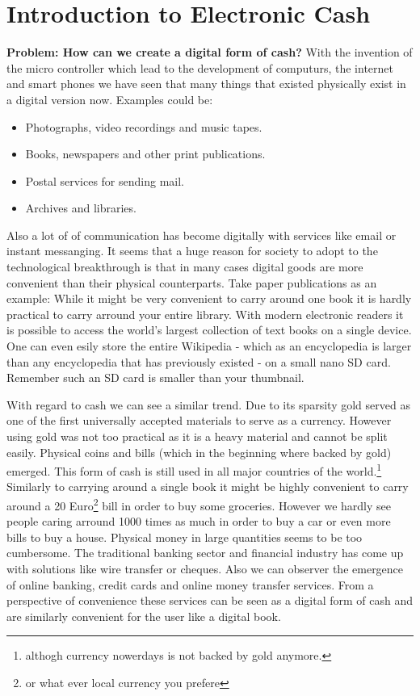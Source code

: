 \documentclass[ebook,12pt,oneside,openany]{memoir}
\newcommand{\problem}[1]{\textbf{Problem: #1}}
\begin{document}
\section{Introduction to Electronic Cash}
\problem{How can we create a digital form of cash?}
With the invention of the micro controller which lead to the development of computurs, the internet and smart phones we have seen that many things that existed physically exist in a digital version now.
Examples could be:
\begin{itemize}
\item Photographs, video recordings and music tapes.
\item Books, newspapers and other print publications.
\item Postal services for sending mail.
\item Archives and libraries.
\end{itemize}
Also a lot of of communication has become digitally with services like email or instant messanging.
It seems that a huge reason for society to adopt to the technological breakthrough is that in many cases digital goods are more convenient than their physical counterparts.
Take paper publications as an example: While it might be very convenient to carry around one book it is hardly practical to carry arround your entire library.
With modern electronic readers it is possible to access the world's largest collection of text books on a single device.
One can even esily store the entire Wikipedia - which as an encyclopedia is larger than any encyclopedia that has previously existed - on a small nano SD card.
Remember such an SD card is smaller than your thumbnail.

With regard to cash we can see a similar trend.
Due to its sparsity gold served as one of the first universally accepted materials to serve as a currency.
However using gold was not too practical as it is a heavy material and cannot be split easily.
Physical coins and bills (which in the beginning where backed by gold) emerged.
This form of cash is still used in all major countries of the world.\footnote{althogh currency nowerdays is not backed by gold anymore.}
Similarly to carrying around a single book it might be highly convenient to carry around a 20 Euro\footnote{or what ever local currency you prefere} bill in order to buy some groceries. However we hardly see people caring arround 1000 times as much in order to buy a car or even more bills to buy a house.
Physical money in large quantities seems to be too cumbersome. 
The traditional banking sector and financial industry has come up with solutions like wire transfer or cheques.
Also we can observer the emergence of online banking, credit cards and online money transfer services.
From a perspective of convenience these services can be seen as a digital form of cash and are similarly convenient for the user like a digital book.
\end{document}
